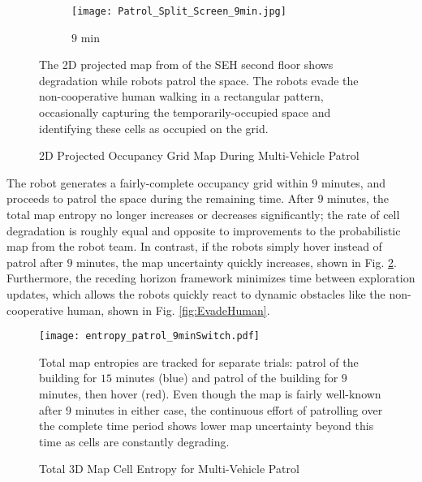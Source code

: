 \begin{figure}[!t]
{    	\begin{subfigure}[t]{0.25\columnwidth}
          	\texttt{[image: Patrol\_Split\_Screen\_9min.jpg]}
        		\caption{$9$ min}
    	\end{subfigure}
	}
	\caption{2D Projected Occupancy Grid Map During Multi-Vehicle Patrol}
	\medskip
	\small
	The 2D projected map from of the SEH second floor shows degradation while robots patrol the space. The robots evade the non-cooperative human walking in a rectangular pattern, occasionally capturing the temporarily-occupied space and identifying these cells as occupied on the grid.
	\label{fig:Sim2DMapPatrol}
\end{figure}




The robot generates a fairly-complete occupancy grid within $9$ minutes, and proceeds to patrol the space during the remaining time. After $9$ minutes, the total map entropy no longer increases or decreases significantly; the rate of cell degradation is roughly equal and opposite to improvements to the probabilistic map from the robot team. In contrast, if the robots simply hover instead of patrol after $9$ minutes, the map uncertainty quickly increases, shown in Fig. \ref{fig:DegradeExamples}. Furthermore, the receding horizon framework minimizes time between exploration updates, which allows the robots quickly react to dynamic obstacles like the non-cooperative human, shown in Fig. \ref{fig:EvadeHuman}.

\begin{figure}
	\centering
	\texttt{[image: entropy\_patrol\_9minSwitch.pdf]}
	\caption{Total 3D Map Cell Entropy for Multi-Vehicle Patrol}
	\medskip
	\small
	Total map entropies are tracked for separate trials: patrol of the building for $15$ minutes (blue) and patrol of the building for $9$ minutes, then hover (red). Even though the map is fairly well-known after $9$ minutes in either case, the continuous effort of patrolling over the complete time period shows lower map uncertainty beyond this time as cells are constantly degrading.
	\label{fig:DegradeExamples}
\end{figure}


